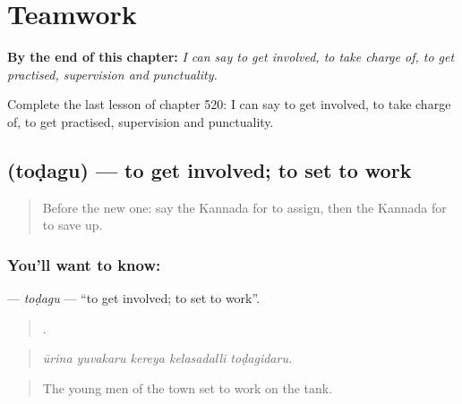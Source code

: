 
\chapter{Teamwork}
\label{ch:ka-teamwork}

\begin{chapteropening}
\textbf{By the end of this chapter:} \emph{I can say to get involved, to take charge of, to get practised, supervision and punctuality.}

Complete the last lesson of chapter 520: I can say to get involved, to take charge of, to get practised, supervision and punctuality.
\end{chapteropening}

\section[\texorpdfstring{\kn{ತೊಡಗು} (toḍagu)}{ತೊಡಗು (toḍagu)}]{ (toḍagu) — to get involved; to set to work}

\label{lesson:KA-C520-todagu}



\begin{quote}
Before the new one: say the Kannada for to assign, then the Kannada for to save up.
\end{quote}

\subsection*{You'll want to know: }
\textbf{} — \emph{toḍagu} — \textquotedblleft{}to get involved; to set to work\textquotedblright{}.

\begin{quote}
    .
\end{quote}

\begin{quote}
\emph{ūrina yuvakaru kereya kelasadalli toḍagidaru.}
\end{quote}

\begin{quote}
The young men of the town set to work on the tank.
\end{quote}

